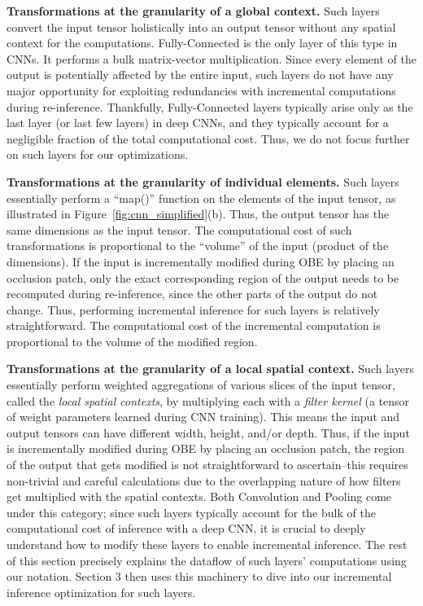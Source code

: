 \vspace{2mm}
\noindent \textbf{Transformations at the granularity of a global context.} 
Such layers convert the input tensor holistically into an output tensor without any spatial context for the computations.
Fully-Connected is the only layer of this type in CNNs. It performs a bulk matrix-vector multiplication.
Since every element of the output is potentially affected by the entire input, such layers do not have any major opportunity for exploiting redundancies with incremental computations during re-inference. Thankfully, Fully-Connected layers typically arise only as the last layer (or last few layers) in deep CNNs, and they typically account for a negligible fraction of the total computational cost. Thus, we do not focus further on such layers for our optimizations.

\vspace{2mm}
\noindent \textbf{Transformations at the granularity of individual elements.} 
Such layers essentially perform a ``map()'' function on the elements of the input tensor, as illustrated in Figure~\ref{fig:cnn_simplified}(b).
Thus, the output tensor has the same dimensions as the input tensor.
The computational cost of such transformations is proportional to the ``volume'' of the input (product of the dimensions).
If the input is incrementally modified during OBE by placing an occlusion patch, only the exact corresponding region of the output needs to be recomputed during re-inference, since the other parts of the output do not change. Thus, performing incremental inference for such layers is relatively straightforward.
The computational cost of the incremental computation is proportional to the volume of the modified region.


\vspace{2mm}
\noindent \textbf{Transformations at the granularity of a local spatial context.}
Such layers essentially perform weighted aggregations of various slices of the input tensor, called the \textit{local spatial contexts}, by multiplying each with a \textit{filter kernel} (a tensor of weight parameters learned during CNN training). This means the input and output tensors can have different width, height, and/or depth.
Thus, if the input is incrementally modified during OBE by placing an occlusion patch, the region of the output that gets modified is not straightforward to ascertain--this requires non-trivial and careful calculations due to the overlapping nature of how filters get multiplied with the spatial contexts. 
Both Convolution and Pooling come under this category; since such layers typically account for the bulk of the computational cost of inference with a deep CNN, it is crucial to deeply understand how to modify these layers to enable incremental inference. The rest of this section precisely explains the dataflow of such layers' computations using our notation. Section 3 then uses this machinery to dive into our incremental inference optimization for such layers.

